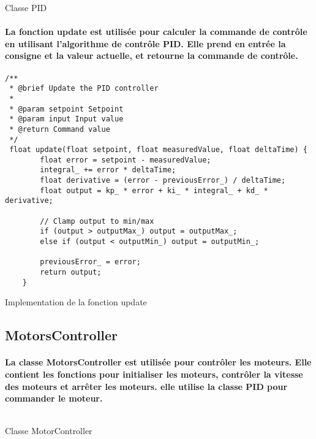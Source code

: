 \begin{listing}[!htpb]
	\inputminted{cpp}{Code/PIDController.h}
	\caption{Classe PID}
	\label{listing:pid}
\end{listing}

\paragraph{La fonction update est utilisée pour calculer la commande de contrôle en utilisant l'algorithme de contrôle PID. Elle prend en entrée la consigne et la valeur actuelle, et retourne la commande de contrôle.}

\begin{listing}[!htpb]
	\begin{verbatim}
/**
 * @brief Update the PID controller
 * 
 * @param setpoint Setpoint
 * @param input Input value
 * @return Command value
 */
 float update(float setpoint, float measuredValue, float deltaTime) {
        float error = setpoint - measuredValue;
        integral_ += error * deltaTime;
        float derivative = (error - previousError_) / deltaTime;
        float output = kp_ * error + ki_ * integral_ + kd_ * derivative;

        // Clamp output to min/max
        if (output > outputMax_) output = outputMax_;
        else if (output < outputMin_) output = outputMin_;

        previousError_ = error;
        return output;
    }
	\end{verbatim}
	\caption{Implementation de la fonction update}
	\label{listing:pid-update}
\end{listing}

\subsection{MotorsController}

\paragraph{La classe MotorsController est utilisée pour contrôler les moteurs. Elle contient les fonctions pour initialiser les moteurs, contrôler la vitesse des moteurs et arrêter les moteurs. elle utilise la classe PID pour commander le moteur.}
\paragraph*{}
\begin{listing}[!htpb]
	\inputminted{cpp}{Code/MotorsController.h}
	\caption{Classe MotorController}
	\label{listing:motor-controller}
\end{listing}

